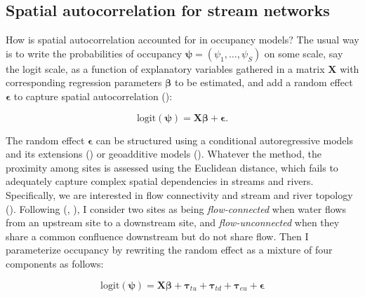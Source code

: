 \documentclass[
  11pt,
  a4paper,
]{article}
\begin{document}
\subsection{Spatial autocorrelation for stream networks}\label{spatial-autocorrelation-for-stream-networks}

How is spatial autocorrelation accounted for in occupancy models? The usual way is to write the probabilities of occupancy \(\boldsymbol{\psi} = (\psi_1, \ldots, \psi_S)\) on some scale, say the logit scale, as a function of explanatory variables gathered in a matrix \(\mathbf{X}\) with corresponding regression parameters \(\boldsymbol{\beta}\) to be estimated, and add a random effect \(\boldsymbol{\epsilon}\) to capture spatial autocorrelation ():

\begin{equation*}
\text{logit}(\boldsymbol{\psi}) = \mathbf{X} \boldsymbol{\beta} + \boldsymbol{\epsilon}.
\end{equation*}

The random effect \(\boldsymbol{\epsilon}\) can be structured using a conditional autoregressive models and its extensions () or geoadditive models (). Whatever the method, the proximity among sites is assessed using the Euclidean distance, which fails to adequately capture complex spatial dependencies in streams and rivers. Specifically, we are interested in flow connectivity and stream and river topology (). Following (, ), I consider two sites as being \emph{flow-connected} when water flows from an upstream site to a downstream site, and \emph{flow-unconnected} when they share a common confluence downstream but do not share flow. Then I parameterize occupancy by rewriting the random effect as a mixture of four components as follows:

\begin{equation*}
\text{logit}(\boldsymbol{\psi}) = \mathbf{X} \boldsymbol{\beta} + \boldsymbol{\tau}_{tu} + \boldsymbol{\tau}_{td} + \boldsymbol{\tau}_{eu} + \boldsymbol{\epsilon}
\end{equation*}
\end{document}
